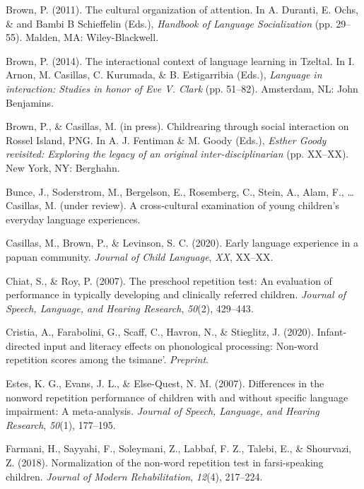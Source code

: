 \documentclass[english,,man,floatsintext]{apa6}
\begin{document}
\hypertarget{ref-brown2011cultural}{}
Brown, P. (2011). The cultural organization of attention. In A. Duranti,
E. Ochs, \& and Bambi B Schieffelin (Eds.), \emph{Handbook of Language
Socialization} (pp. 29--55). Malden, MA: Wiley-Blackwell.

\hypertarget{ref-brown2014interactional}{}
Brown, P. (2014). The interactional context of language learning in
Tzeltal. In I. Arnon, M. Casillas, C. Kurumada, \& B. Estigarribia
(Eds.), \emph{Language in interaction: Studies in honor of Eve V. Clark}
(pp. 51--82). Amsterdam, NL: John Benjamins.

\hypertarget{ref-brownIPchildrearing}{}
Brown, P., \& Casillas, M. (in press). Childrearing through social
interaction on Rossel Island, PNG. In A. J. Fentiman \& M. Goody (Eds.),
\emph{Esther Goody revisited: Exploring the legacy of an original
inter-disciplinarian} (pp. XX--XX). New York, NY: Berghahn.

\hypertarget{ref-bunceURcrosscultural}{}
Bunce, J., Soderstrom, M., Bergelson, E., Rosemberg, C., Stein, A.,
Alam, F., \ldots{} Casillas, M. (under review). A cross-cultural
examination of young children's everyday language experiences.

\hypertarget{ref-casillas2020early}{}
Casillas, M., Brown, P., \& Levinson, S. C. (2020). Early language
experience in a papuan community. \emph{Journal of Child Language},
\emph{XX}, XX--XX.

\hypertarget{ref-chiat2007preschool}{}
Chiat, S., \& Roy, P. (2007). The preschool repetition test: An
evaluation of performance in typically developing and clinically
referred children. \emph{Journal of Speech, Language, and Hearing
Research}, \emph{50}(2), 429--443.

\hypertarget{ref-cristia2020infant}{}
Cristia, A., Farabolini, G., Scaff, C., Havron, N., \& Stieglitz, J.
(2020). Infant-directed input and literacy effects on phonological
processing: Non-word repetition scores among the tsimane'.
\emph{Preprint}.

\hypertarget{ref-estes2007differences}{}
Estes, K. G., Evans, J. L., \& Else-Quest, N. M. (2007). Differences in
the nonword repetition performance of children with and without specific
language impairment: A meta-analysis. \emph{Journal of Speech, Language,
and Hearing Research}, \emph{50}(1), 177--195.

\hypertarget{ref-farmani2018normalization}{}
Farmani, H., Sayyahi, F., Soleymani, Z., Labbaf, F. Z., Talebi, E., \&
Shourvazi, Z. (2018). Normalization of the non-word repetition test in
farsi-speaking children. \emph{Journal of Modern Rehabilitation},
\emph{12}(4), 217--224.
\end{document}
